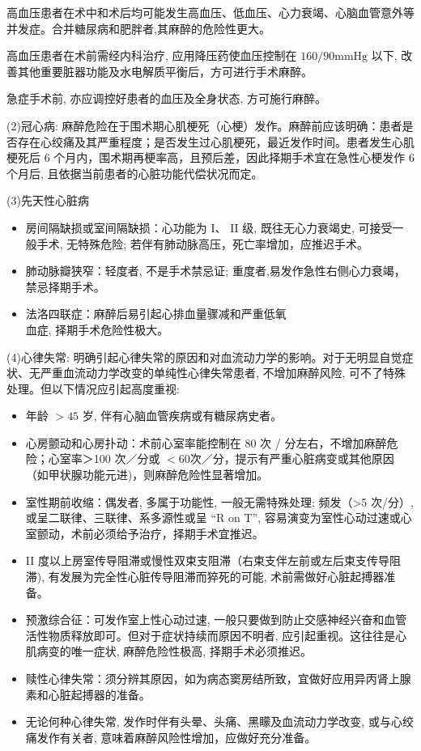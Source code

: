 \documentclass[10pt]{article}
\begin{document}
高血压患者在术中和术后均可能发生高血压、低血压、心力衰竭、心脑血管意外等并发症。合并糖尿病和肥胖者,其麻醉的危险性更大。

高血压患者在术前需经内科治疗, 应用降压药使血压控制在 $160 / 90 \mathrm{mmHg}$ 以下, 改善其他重要脏器功能及水电解质平衡后，方可进行手术麻醉。

急症手术前, 亦应调控好患者的血压及全身状态, 方可施行麻醉。

(2)冠心病: 麻醉危险在于围术期心肌梗死（心梗）发作。麻醉前应该明确：患者是否存在心绞痛及其严重程度；是否发生过心肌梗死，最近发作时间。患者发生心肌梗死后 6 个月内，围术期再梗率高，且预后差，因此择期手术宜在急性心梗发作 6 个月后, 且依据当前患者的心脏功能代偿状况而定。

(3)先天性心脏病

\begin{itemize}
  \item 房间隔缺损或室间隔缺损：心功能为 I、 II 级, 既往无心力衰竭史, 可接受一般手术, 无特殊危险; 若伴有肺动脉高压，死亡率增加，应推迟手术。
  \item 肺动脉瓣狭窄：轻度者, 不是手术禁忌证; 重度者,易发作急性右侧心力衰竭，禁忌择期手术。
  \item 法洛四联症：麻醉后易引起心排血量骤减和严重低氧\\
血症, 择期手术危险性极大。
\end{itemize}

(4)心律失常: 明确引起心律失常的原因和对血流动力学的影响。对于无明显自觉症状、无严重血流动力学改变的单纯性心律失常患者, 不增加麻醉风险, 可不了特殊处理。但以下情况应引起高度重视:

\begin{itemize}
  \item 年龄 $>45$ 岁, 伴有心脑血管疾病或有糖尿病史者。
  \item 心房颤动和心房扑动：术前心室率能控制在 80 次 / 分左右，不增加麻醉危险；心室率＞100 次／分或 $<60$次／分，提示有严重心脏病变或其他原因（如甲状腺功能元进)，则麻醉危险性显著增加。
  \item 室性期前收缩：偶发者, 多属于功能性, 一般无需特殊处理; 频发（>5 次/分）, 或呈二联律、三联律、系多源性或呈 “R on T”, 容易演变为室性心动过速或心室颤动，术前必须给予治疗，择期手术宜推迟。
  \item II 度以上房室传导阻滞或慢性双束支阻滞（右束支伴左前或左后束支传导阻滞), 有发展为完全性心脏传导阻滞而猝死的可能, 术前需做好心脏起搏器准备。
  \item 预激综合征：可发作室上性心动过速, 一般只要做到防止交感神经兴奋和血管活性物质释放即可。但对于症状持续而原因不明者, 应引起重视。这往往是心肌病变的唯一症状, 麻醉危险性极高, 择期手术必须推迟。
  \item 赎性心律失常：须分辨其原因，如为病态窦房结所致，宜做好应用异丙肾上腺素和心脏起搏器的准备。
  \item 无论何种心律失常, 发作时伴有头晕、头痛、黑矇及血流动力学改变, 或与心绞痛发作有关者, 意味着麻醉风险性增加，应做好充分准备。
\end{itemize}
\end{document}
